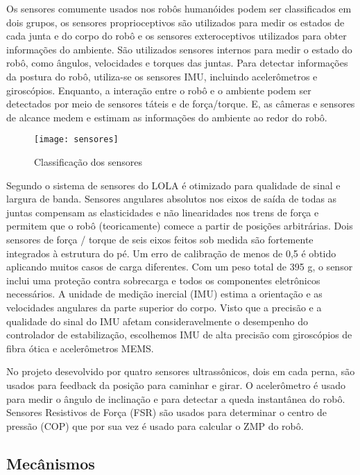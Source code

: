 Os sensores comumente usados nos robôs humanóides podem ser classificados em dois grupos, os sensores proprioceptivos são utilizados para medir os estados de cada junta e do corpo do robô e os sensores exteroceptivos utilizados para obter informações do ambiente. São utilizados sensores internos para medir o estado do robô, como ângulos, velocidades e torques das juntas. Para detectar informações da postura do robô, utiliza-se os sensores IMU, incluindo acelerômetros e giroscópios. Enquanto, a interação entre o robô e o ambiente podem ser detectados por meio de sensores táteis e de força/torque. E, as câmeras e sensores de alcance medem e estimam as informações do ambiente ao redor do robô. 

\begin{figure} [H]
    \centering
    \caption{Classificação dos sensores}
    \texttt{[image: sensores]}
    \label{fig:sensors}
\end{figure}

Segundo  o sistema de sensores do LOLA é otimizado para qualidade de sinal e largura de banda. Sensores angulares absolutos nos eixos de saída de todas as juntas compensam as elasticidades e não linearidades nos trens de força e permitem que o robô (teoricamente) comece a partir de posições arbitrárias. Dois sensores de força / torque de seis eixos feitos sob medida são fortemente integrados à estrutura do pé. Um erro de calibração de menos de 0,5 é obtido aplicando muitos casos de carga diferentes. Com um peso total de 395 g, o sensor inclui uma proteção contra sobrecarga e todos os componentes eletrônicos necessários. A unidade de medição inercial (IMU) estima a orientação e as velocidades angulares da parte superior do corpo. Visto que a precisão e a qualidade do sinal do IMU afetam consideravelmente o desempenho do controlador de estabilização, escolhemos IMU de alta precisão com giroscópios de fibra ótica e acelerômetros MEMS.

No projeto desevolvido por  quatro sensores ultrassônicos, dois em cada perna, são usados para feedback da posição para caminhar e girar. O acelerômetro é usado para medir o ângulo de inclinação e para detectar a queda instantânea do robô. Sensores Resistivos de Força (FSR) são usados para determinar o centro de pressão (COP) que por sua vez é usado para calcular o ZMP do robô.


\subsection{Mecânismos}
\label{ssec:mec}

